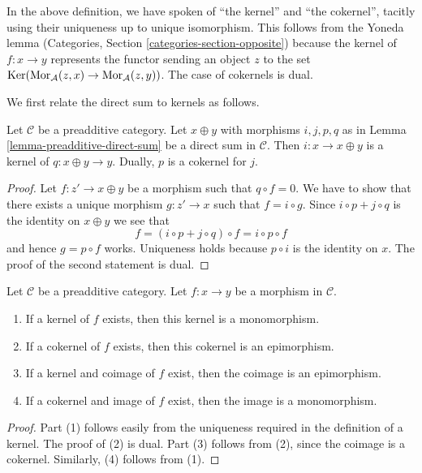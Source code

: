 \noindent
In the above definition, we have spoken of ``the kernel'' and
``the cokernel'', tacitly using their uniqueness
up to unique isomorphism. This follows from the Yoneda lemma
(Categories, Section \ref{categories-section-opposite})
because the kernel of $f : x \to y$ represents the functor
sending an object $z$ to the set
$\mathop{\mathrm{Ker}}(\mathop{\mathrm{Mor}}\nolimits_\mathcal{A}(z, x) \to \mathop{\mathrm{Mor}}\nolimits_\mathcal{A}(z, y))$.
The case of cokernels is dual.

\medskip\noindent
We first relate the direct sum to kernels as follows.

\begin{lemma}
\label{lemma-additive-cat-biproduct-kernel}
Let $\mathcal{C}$ be a preadditive category.
Let $x \oplus y$ with morphisms $i, j, p, q$ as in
Lemma \ref{lemma-preadditive-direct-sum}
be a direct sum in $\mathcal{C}$. Then $i : x \to x \oplus y$
is a kernel of $q : x \oplus y \rightarrow y$. Dually, $p$ is
a cokernel for $j$.
\end{lemma}

\begin{proof}
Let $f : z' \to x \oplus y$ be a morphism such that $q \circ f = 0$.
We have to show that there exists a unique morphism $g : z' \to x$
such that $f = i \circ g$. Since $i \circ p + j \circ q$ is the identity on
$x \oplus y$ we see that
$$
f = (i \circ p + j \circ q) \circ f = i \circ p \circ f
$$
and hence $g = p \circ f$ works. Uniqueness holds because $p \circ i$
is the identity on $x$. The proof of the second statement is dual.
\end{proof}

\begin{lemma}
\label{lemma-kernel-mono}
Let $\mathcal{C}$ be a preadditive category.
Let $f : x \to y$ be a morphism in $\mathcal{C}$.
\begin{enumerate}
\item If a kernel of $f$ exists, then
this kernel is a monomorphism.
\item If a cokernel of $f$ exists, then
this cokernel is an epimorphism.
\item If a kernel and coimage of $f$ exist, then
the coimage is an epimorphism.
\item If a cokernel and image of $f$ exist, then
the image is a monomorphism.
\end{enumerate}
\end{lemma}

\begin{proof}
Part (1) follows easily from the uniqueness required in the
definition of a kernel. The proof of (2) is dual.
Part (3) follows from (2), since the coimage is a cokernel.
Similarly, (4) follows from (1).
\end{proof}

